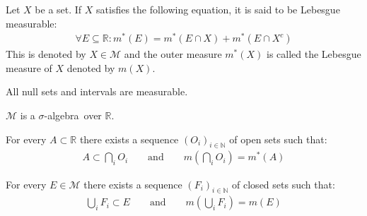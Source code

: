         \begin{theorem}
        	Let $X$ be a set. If $X$ satisfies the following equation, it is said to be Lebesgue measurable:
		\begin{gather}
			\label{lebesgue:lebesgue_measure}
                	\forall E\subseteq\mathbb{R}:m^*(E) = m^*(E\cap X) + m^*(E\cap X^c)
		\end{gather}
		This is denoted by $X\in\mathcal{M}$ and the outer measure $m^*(X)$ is called the Lebesgue measure of $X$ denoted by $m(X)$.
        \end{theorem}
        \begin{property}
		All null sets and intervals are measurable.
	\end{property}
        
        \begin{property}
		$\mathcal{M}$ is a $\sigma$-algebra\footnotemark\ over $\mathbb{R}$.
	\end{property}
        
        \begin{theorem}
		For every $A\subset\mathbb{R}$ there exists a sequence $(O_i)_{i\in\mathbb{N}}$ of open sets such that:
        	\begin{gather}
            		\label{lebesgue:theorem:open_cover_existence}
			A\subset\bigcap_iO_i\qquad\text{and}\qquad m\left(\bigcap_iO_i\right) = m^*(A)
		\end{gather}
	\end{theorem}
        \begin{theorem}
		For every $E\in\mathcal{M}$ there exists a sequence $(F_i)_{i\in\mathbb{N}}$ of closed sets such that:
		\begin{gather}
            		\label{lebesgue:theorem:closed_cover_existence}
			\bigcup_iF_i\subset E\qquad\text{and}\qquad m\left(\bigcup_iF_i\right) = m(E)
		\end{gather}
	\end{theorem}
        
